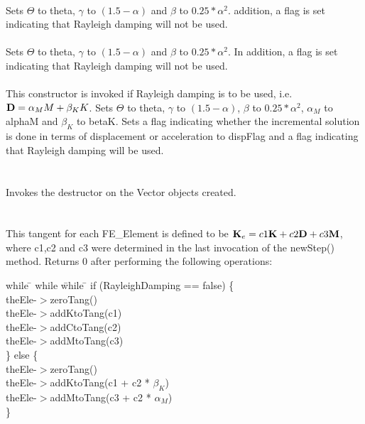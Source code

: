 \\ 
Sets $\Theta$ to \p theta, $\gamma$ to $(1.5 - \alpha)$ and $\beta$
to $0.25*\alpha^2$. addition, a flag is set indicating that Rayleigh
damping will not be used. \\ 

\\ 
Sets $\Theta$ to \p theta, $\gamma$ to $(1.5 - \alpha)$ and $\beta$
to $0.25*\alpha^2$. In addition, a flag is set indicating that Rayleigh
damping will not be used. \\

\\ 
This constructor is invoked if Rayleigh damping is to be used, 
i.e. ${\bf D} = \alpha_M M + \beta_K K$. Sets $\Theta$ to \p theta,
$\gamma$ to $(1.5 - \alpha)$, $\beta$ to $0.25*\alpha^2$, $\alpha_M$ to
\p alphaM and $\beta_K$ to \p betaK. Sets a flag indicating whether the
incremental solution is done in terms of displacement or acceleration
to \p dispFlag and a flag indicating that Rayleigh damping will 
be used. \\ 


 \\
\\ 
Invokes the destructor on the Vector objects created. \\

\\
 \\
This tangent for each FE\_Element is defined to be ${\bf K}_e = c1 {\bf K}
+ c2  {\bf D} + c3 {\bf M}$, where c1,c2 and c3 were determined in the last invocation
of the newStep() method. Returns $0$ after performing the
following operations:  
\begin{tabbing}
while \= \+ while \= while \= \kill
if (RayleighDamping == false) \{ \+ \\
theEle-$>$zeroTang() \\
theEle-$>$addKtoTang(c1) \\
theEle-$>$addCtoTang(c2) \\
theEle-$>$addMtoTang(c3)  \- \\
\} else \{ \+ \\
theEle-$>$zeroTang() \\
theEle-$>$addKtoTang(c1 + c2 * $\beta_K$) \\
theEle-$>$addMtoTang(c3 + c2 * $\alpha_M$)  \- \\ 
\}
\end{tabbing}

